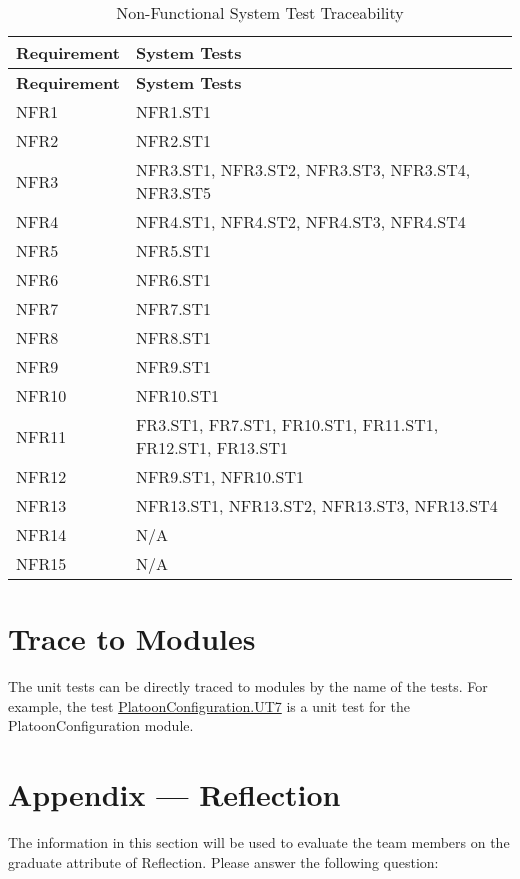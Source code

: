 \documentclass[12pt, titlepage]{article}
\begin{document}
\begin{longtable}[H]{|p{} | p{}|}
  \caption{Non-Functional System Test Traceability}
  \label{TblNFRSTTraceability}\\
  \hline
  \textbf{Requirement} & \textbf{System Tests}\\
  \hline
  \endfirsthead
  \hline
  \textbf{Requirement} & \textbf{System Tests}\\
  \hline
  \endhead
  NFR1 & NFR1.ST1\\
  \hline
  NFR2 & NFR2.ST1\\
  \hline
  NFR3 & NFR3.ST1, NFR3.ST2, NFR3.ST3, NFR3.ST4, NFR3.ST5\\
  \hline
  NFR4 & NFR4.ST1, NFR4.ST2, NFR4.ST3, NFR4.ST4\\
  \hline
  NFR5 & NFR5.ST1\\
  \hline
  NFR6 & NFR6.ST1\\
  \hline
  NFR7 & NFR7.ST1\\
  \hline
  NFR8 & NFR8.ST1\\
  \hline
  NFR9 & NFR9.ST1\\
  \hline
  NFR10 & NFR10.ST1\\
  \hline
  NFR11 & FR3.ST1, FR7.ST1, FR10.ST1, FR11.ST1, FR12.ST1, FR13.ST1\\
  \hline
  NFR12 & NFR9.ST1, NFR10.ST1\\
  \hline
  NFR13 & NFR13.ST1, NFR13.ST2, NFR13.ST3, NFR13.ST4\\
  \hline
  NFR14 & N/A\\
  \hline
  NFR15 & N/A\\
  \hline
\end{longtable}

\section{Trace to Modules}
The unit tests can be directly traced to modules by the name of the tests. For example, the test \hyperref[PlatoonConfiguration.UT7]{PlatoonConfiguration.UT7} is a unit test for the PlatoonConfiguration module.




\newpage{}
\section*{Appendix --- Reflection}

The information in this section will be used to evaluate the team members on the
graduate attribute of Reflection.  Please answer the following question:
\end{document}
